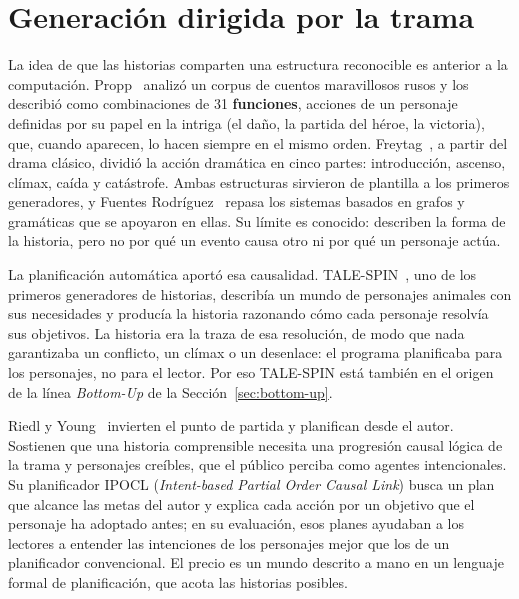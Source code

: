 \section{Generación dirigida por la trama}\label{sec:top-down}

La idea de que las historias comparten una estructura reconocible es anterior a la computación.
Propp~\cite{propp1968} analizó un corpus de cuentos maravillosos rusos y los describió como
combinaciones de 31 \textbf{funciones}, acciones de un personaje definidas por su papel en la intriga
(el daño, la partida del héroe, la victoria), que, cuando aparecen, lo hacen siempre en el mismo
orden. Freytag~\cite{freytag1895}, a partir del drama clásico, dividió la acción dramática en cinco
partes: introducción, ascenso, clímax, caída y catástrofe. Ambas estructuras sirvieron de plantilla
a los primeros generadores, y Fuentes Rodríguez~\cite{fuentes2025} repasa los sistemas basados en
grafos y gramáticas que se apoyaron en ellas. Su límite es conocido: describen la forma de la
historia, pero no por qué un evento causa otro ni por qué un personaje actúa.

La planificación automática aportó esa causalidad. TALE-SPIN~\cite{meehan1977}, uno de los primeros
generadores de historias, describía un mundo de personajes animales con sus necesidades y producía
la historia razonando cómo cada personaje resolvía sus objetivos. La historia era la traza de esa
resolución, de modo que nada garantizaba un conflicto, un clímax o un desenlace: el programa
planificaba para los personajes, no para el lector. Por eso TALE-SPIN está también en el origen de
la línea \textit{Bottom-Up} de la Sección~\ref{sec:bottom-up}.

Riedl y Young~\cite{riedl2010}
invierten el punto de partida y planifican desde el autor. Sostienen que una historia comprensible
necesita una progresión causal lógica de la trama y personajes creíbles, que el público perciba como
agentes intencionales. Su planificador IPOCL (\textit{Intent-based Partial Order Causal Link}) busca
un plan que alcance las metas del autor y explica cada acción por un objetivo que el personaje ha
adoptado antes; en su evaluación, esos planes ayudaban a los lectores a entender las intenciones de
los personajes mejor que los de un planificador convencional. El precio es un mundo descrito a mano
en un lenguaje formal de planificación, que acota las historias posibles.

